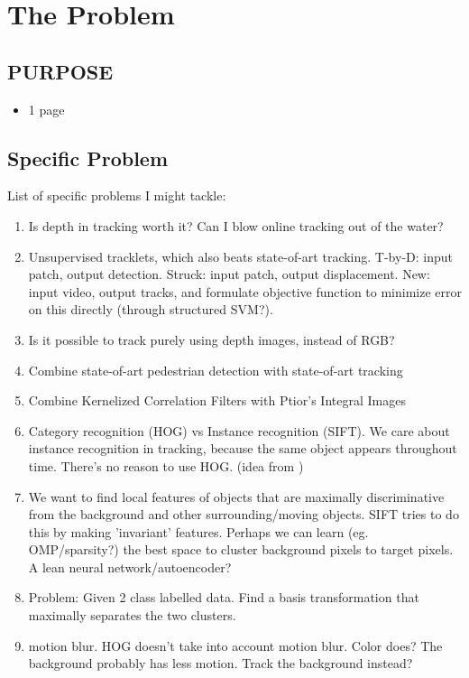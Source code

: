 \chapter{The Problem}

\section*{PURPOSE}
\begin{itemize}
\item 1 page
\end{itemize}


\section{Specific Problem}
List of specific problems I might tackle:
\begin{enumerate}
\item Is depth in tracking worth it? Can I blow online tracking out of the water?
\item Unsupervised tracklets, which also beats state-of-art tracking. T-by-D: input patch, output detection. Struck: input patch, output displacement. New: input video, output tracks, and formulate objective function to minimize error on this directly (through structured SVM?).
\item Is it possible to track purely using depth images, instead of RGB?
\item Combine state-of-art pedestrian detection with state-of-art tracking
\item Combine Kernelized Correlation Filters with Ptior's Integral Images
\item Category recognition (HOG) vs Instance recognition (SIFT). We care about instance recognition in tracking, because the same object appears throughout time. There's no reason to use HOG. (idea from \cite{breitenstein2009robust})
\item We want to find local features of objects that are maximally discriminative from the background and other surrounding/moving objects. SIFT tries to do this by making 'invariant' features. Perhaps we can learn (eg. OMP/sparsity?) the best space to cluster background pixels to target pixels. A lean neural network/autoencoder?
\item Problem: Given 2 class labelled data. Find a basis transformation that maximally separates the two clusters.
\item motion blur. HOG doesn't take into account motion blur. Color does? The background probably has less motion. Track the background instead?
\end{enumerate}

